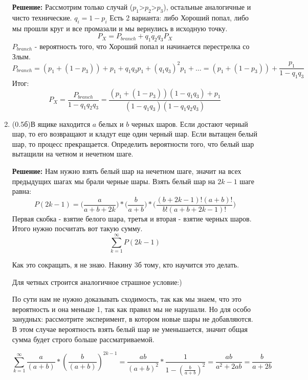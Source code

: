 \documentclass[a4paper, 14pt]{extarticle}
\begin{document}
\begin{enumerate}
\textbf{Решение:}
Рассмотрим только случай ($p_1$>$p_2$>$p_3$), остальные аналогичные и чисто технические.
\newline
$q_i = 1-p_i$
Есть 2 варианта: либо Хороший попал, либо мы прошли круг и все промазали и мы вернулись в исходную точку.
$$P_X = P_{branch} + q_1q_2q_3P_X$$
$P_{branch}$ - вероятность того, что Хороший попал и начинается перестрелка со Злым.
$$P_{branch} = (p_1 + (1-p_3)) + p_1 + q_1q_3p_1 + (q_1q_3)^2p_1 + \ldots = (p_1 + (1-p_3)) + \frac{p_1}{1-q_1q_3}$$
Итог:
$$P_X = \frac{P_{branch}}{1-q_1q_2q_3} = \frac{(p_1 + (1-p_3))(1-q_1q_3) + p_1}{(1-q_1q_3)(1-q_1q_2q_3)}$$


\item (0.5б)В ящике находится $a$ белых и $b$ черных шаров. Если достают черный шар, то его возвращают и кладут еще один черный шар. Если вытащен белый шар, то процесс прекращается. Определить вероятности того, что белый шар вытащили на четном и нечетном шаге.


\textbf{Решение:}
Нам нужно взять белый шар на нечетном шаге, значит на всех предыдущих шагах мы брали черные шары. Взять белый шар на $2k-1$ шаге равна:
$$P(2k-1) = \Big(\frac{a}{a+b+2k}\Big)*
\Big(\frac{b}{a+b}\Big)*
\Big(\frac{(b+2k-1)!(a+b)!}{b!(a+b+2k-1)!}\Big)$$
Первая скобка - взятие белого шара, третья и вторая - взятие черных шаров. Итого нужно посчитать вот такую сумму.
$$\sum_{k=1}^{\infty}P(2k-1)$$

Как это сокращать, я не знаю. Накину 3б тому, кто научится это делать.


Для четных строится аналогичное страшное условие:)

По сути нам не нужно доказывать сходимость, так как мы знаем, что это вероятность и она меньше 1, так как правил мы не нарушали. Но для особо занудных: рассмотрите эксперимент, в котором новые шары не добавляются. В этом случае вероятность взять белый шар не уменьшается, значит общая сумма будет строго больше рассматриваемой. 

$$\sum_{k=1}^{\infty}\frac{a}{(a+b)}*(\frac{b}{(a+b)})^{2k-1} = \frac{ab}{(a+b)^2}*\frac{1}{1-(\frac{b}{a+b})^2} = \frac{ab}{a^2 + 2ab} = \frac{b}{a + 2b}$$
\end{enumerate}
\end{document}
